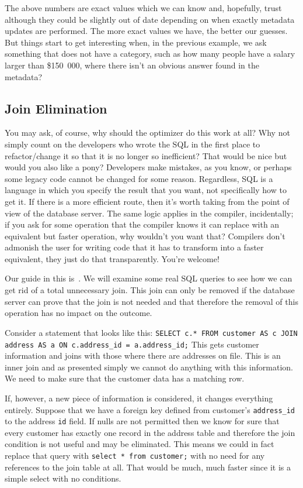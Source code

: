 The above numbers are exact values which we can know and, hopefully, trust although they could be slightly out of date depending on when exactly metadata updates are performed. The more exact values we have, the better our guesses. But things start to get interesting when, in the previous example, we ask something that does not have a category, such as how many people have a salary larger than \$150~000, where there isn't an obvious answer found in the metadata?

\subsection*{Join Elimination}

You may ask, of course, why should the optimizer do this work at all? Why not simply count on the developers who wrote the SQL in the first place to refactor/change it so that it is no longer so inefficient? That would be nice but would you also like a pony?  Developers make mistakes, as you know, or perhaps some legacy code cannot be changed for some reason. Regardless, SQL is a language in which you specify the result that you want, not specifically how to get it. If there is a more efficient route, then it's worth taking from the point of view of the database server. The same logic applies in the compiler, incidentally; if you ask for some operation that the compiler knows it can replace with an equivalent but faster operation, why wouldn't you want that? Compilers don't admonish the user for writing code that it has to transform into a faster equivalent, they just do that transparently. You're welcome!

Our guide in this is~\cite{joinelim}. We will examine some real SQL queries to see how we can get rid of a total unnecessary join. This join can only be removed if the database server can prove that the join is not needed and that therefore the removal of this operation has no impact on the outcome.


Consider a statement that looks like this: \texttt{SELECT c.* FROM customer AS c JOIN address AS a ON c.address\_id = a.address\_id;} This gets customer information and joins with those where there are addresses on file. This is an inner join and as presented simply we cannot do anything with this information. We need to make sure that the customer data has a matching row.

If, however, a new piece of information is considered, it changes everything entirely. Suppose that we have a foreign key defined from customer's \texttt{address\_id} to the address \texttt{id} field. If nulls are not permitted then we know for sure that every customer has exactly one record in the address table and therefore the join condition is not useful and may be eliminated. This means we could in fact replace that query with \texttt{select * from customer;} with no need for any references to the join table at all. That would be much, much faster since it is a simple select with no conditions.

